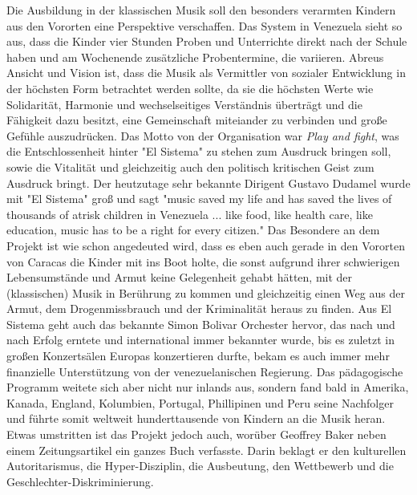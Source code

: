 Die Ausbildung in der klassischen Musik soll den besonders verarmten Kindern aus den Vororten
eine Perspektive verschaffen. Das System in Venezuela sieht so aus, dass die
Kinder vier Stunden Proben und Unterrichte direkt nach der Schule haben und am
Wochenende zusätzliche Probentermine, die variieren. Abreus Ansicht und Vision ist, dass die
Musik als Vermittler von sozialer Entwicklung in der höchsten Form betrachtet
werden sollte, da sie die höchsten Werte wie Solidarität, Harmonie und
wechselseitiges Verständnis überträgt und die Fähigkeit dazu besitzt, eine
Gemeinschaft miteiander zu verbinden und große Gefühle auszudrücken. Das Motto
von der Organisation war \emph{Play and fight}, was die Entschlossenheit hinter "El
Sistema" zu stehen zum Ausdruck bringen soll, sowie die Vitalität und
gleichzeitig auch den politisch kritischen Geist zum Ausdruck bringt. Der
heutzutage sehr bekannte Dirigent Gustavo Dudamel wurde mit "El Sistema" groß
und sagt "music saved my life and has saved the lives of thousands of atrisk
children in Venezuela ... like food, like health care, like education, music has
to be a right for every citizen."%
Das Besondere an dem Projekt ist wie schon angedeuted wird, dass es eben auch
gerade in den Vororten von Caracas die Kinder mit ins Boot holte, die sonst
aufgrund ihrer schwierigen Lebensumstände und Armut keine Gelegenheit gehabt
hätten, mit der (klassischen) Musik in Berührung zu kommen und gleichzeitig
einen Weg aus der Armut, dem Drogenmissbrauch und der Kriminalität heraus zu
finden. Aus El Sistema geht auch das bekannte Simon Bolivar Orchester hervor,
das nach und nach Erfolg erntete und international
immer bekannter wurde, bis es zuletzt in großen Konzertsälen Europas
konzertieren durfte, bekam es auch immer mehr finanzielle Unterstützung von der
venezuelanischen Regierung. Das pädagogische Programm weitete sich aber nicht
nur inlands aus, sondern fand bald in Amerika, Kanada, England, Kolumbien,
Portugal, Phillipinen und Peru seine Nachfolger und führte somit weltweit
hunderttausende von Kindern an die Musik heran. Etwas umstritten ist das Projekt
jedoch auch, worüber Geoffrey Baker neben einem Zeitungsartikel ein ganzes
Buch verfasste. Darin beklagt er den kulturellen Autoritarismus, die
Hyper-Disziplin, die Ausbeutung, den Wettbewerb und die
Geschlechter-Diskriminierung. 

